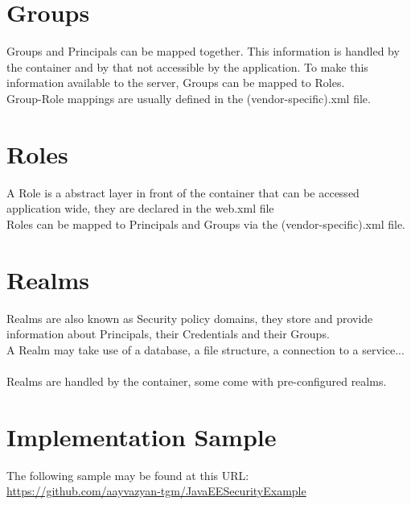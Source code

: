 \documentclass[12pt,a4paper]{report}
\begin{document}
\section{Groups}
Groups and Principals can be mapped together. This information is handled by the container and by that not accessible by the application. To make this information available to the server, Groups can be mapped to Roles.\\
Group-Role mappings are usually defined in the (vendor-specific).xml file.\\

\section{Roles}
A Role is a abstract layer in front of the container that can be accessed application wide, they are declared in the web.xml file\\
Roles can be mapped to Principals and Groups via the (vendor-specific).xml file.\\

\section{Realms}
Realms are also known as Security policy domains, they store and provide information about Principals, their Credentials and their Groups.\\
A Realm may take use of a database, a file structure, a connection to a service...\\\\
Realms are handled by the container, some come with pre-configured realms.

\newpage
\section{Implementation Sample}
The following sample may be found at this URL:\\
\href{https://github.com/aayvazyan-tgm/JavaEESecurityExample}{https://github.com/aayvazyan-tgm/JavaEESecurityExample}\\
\end{document}
